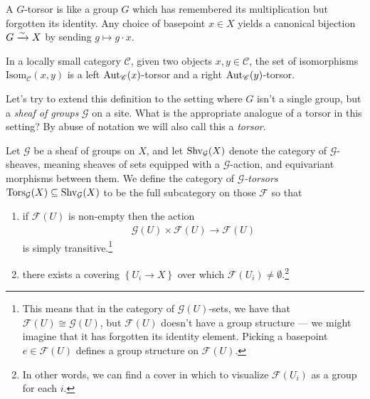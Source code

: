 \documentclass[11pt]{amsart}
\begin{document}
\begin{intuition} A $G$-torsor is like a group $G$ which has remembered its multiplication but forgotten its identity. Any choice of basepoint $x\in X$ yields a canonical bijection $G \xrightarrow{\sim} X$ by sending $g \mapsto g\cdot x$.
\end{intuition}

\begin{example} In a locally small category $\mathscr{C}$, given two objects $x,y \in \mathscr{C}$, the set of isomorphisms $\mathrm{Isom}_{\mathscr{C}}(x , y)$ is a left $\mathrm{Aut}_{\mathscr{C}}(x)$-torsor and a right $\mathrm{Aut}_{\mathscr{C}}(y)$-torsor.
\end{example}


Let's try to extend this definition to the setting where $G$ isn't a single group, but a \textit{sheaf of groups} $\mathcal{G}$ on a site. What is the appropriate analogue of a torsor in this setting? By abuse of notation we will also call this a \textit{torsor}.

\begin{definition}\label{def:torsor} 
\cite[03AH]{Stacks} Let $\mathcal{G}$ be a sheaf of groups on $X$, and let $\mathrm{Shv}_\mathcal{G}(X)$ denote the category of $\mathcal{G}$-sheaves, meaning sheaves of sets equipped with a $\mathcal{G}$-action, and equivariant morphisms between them. We define the category of $\mathcal{G}$\textit{-torsors} $\mathrm{Tors}_\mathcal{G}(X) \subseteq \mathrm{Shv}_\mathcal{G}(X)$ to be the full subcategory on those $\mathcal{F}$ so that
\begin{enumerate}
    \item if $\mathcal{F}(U)$ is non-empty then the action
    \begin{align*}
        \mathcal{G}(U) \times \mathcal{F}(U) \to \mathcal{F}(U)
    \end{align*}
    is simply transitive.\footnote{This means that in the category of $\mathcal{G}(U)$-sets, we have that $\mathcal{F}(U) \cong \mathcal{G}(U)$, but $\mathcal{F}(U)$ doesn't have a group structure --- we might imagine that it has forgotten its identity element. Picking a basepoint $e\in \mathcal{F}(U)$ defines a group structure on $\mathcal{F}(U)$.} 
    
    \item there exists a covering $\left\{ U_i \to X \right\}$ over which $\mathcal{F}(U_i) \ne \emptyset$.\footnote{In other words, we can find a cover in which to visualize $\mathcal{F}(U_i)$ as a group for each $i$.}
\end{enumerate}
\end{definition}
\end{document}
